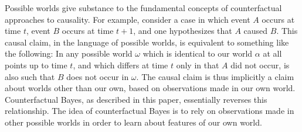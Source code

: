 \documentclass[12pt]{article}
\begin{document}
%
Possible worlds give substance to the fundamental concepts of counterfactual approaches to causality.
%
For example, consider a case in which event $A$ occurs at time $t$, event $B$ occurs at time $t+1$, and one hypothesizes that $A$ caused $B$.
%
This causal claim, in the language of possible worlds, is equivalent to something like the following: In any possible world $\omega$ which is identical to our world $\alpha$ at all points up to time $t$, and which differs at time $t$ only in that $A$ did not occur, is also such that $B$ does not occur in $\omega$.
%
The causal claim is thus implicitly a claim about worlds other than our own, based on observations made in our own world.
%
Counterfactual Bayes, as described in this paper, essentially reverses this relationship.
%
The idea of counterfactual Bayes is to rely on observations made in other possible worlds in order to learn about features of our own world.
%

\end{document}
